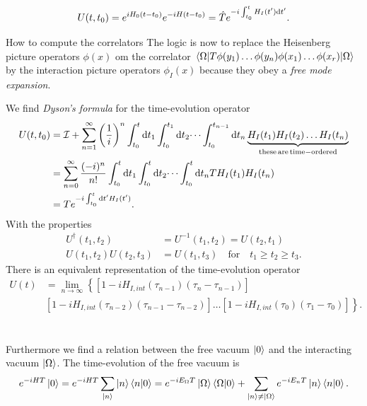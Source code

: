 \begin{equation}
U(t,t_0) = e^{i H_0(t-t_0)} e^{-i H(t-t_0)} = \hat{T}e^{-i \int_{t_0}^{t} H_I(t') \mathrm{d} t'}.
\end{equation}
\begin{mybox}{How to compute the correlators}
	The logic is now to replace the Heisenberg picture operators $\phi(x)$ om the correlator $\expval{T\phi(y_1) \dots \phi(y_n) \phi(x_1) \dots \phi(x_r)}{\Omega}$ by the interaction picture operators $\phi_I(x)$ because they obey a \emph{free mode expansion}.\\
\end{mybox}
We find \emph{Dyson's formula} for the time-evolution operator
\begin{align}
	U(t,t_0) &= \mathcal{I} + \sum_{n=1}^{\infty} \left(\frac{1}{i}\right)^n \int_{t_0}^{t} \mathrm{d} t_1 \int_{t_0}^{t_1} \mathrm{d} t_2 \dots \int_{t_0}^{t_{n-1}} \mathrm{d} t_n \underbrace{H_I(t_1)H_I(t_2)\dots H_I(t_n)}_{\mathrm{these \, are\, time-ordered}}\\
	&= \sum_{n=0}^{\infty} \frac{(-i)^n}{n!} \int_{t_0}^{t}\mathrm{d} t_1 \int_{t_0}^{t} \mathrm{d} t_2 \dots \int_{t_0}^{t} \mathrm{d} t_n T H_I (t_1)H_I(t_n) \\
	&=T e^{-i \int_{t_0}^{t} \mathrm{d} t'H_I(t')}.
\end{align}
With the properties
\begin{align}
	U^{\dagger}(t_1,t_2) &=U^{-1}(t_1,t_2) = U(t_2,t_1) \\
	U(t_1,t_2)U(t_2,t_3) &= U(t_1,t_3) \quad \mathrm{for} \quad t_1 \geq t_2 \geq t_3.
\end{align}
There is an equivalent representation of the time-evolution operator
\begin{align}
	U(t) &= \lim_{n\rightarrow \infty} \left\{  \left[1-i H_{I,int} (\tau_{n-1}) (\tau_n - \tau_{n-1})\right] \right. \\
	&\left.\left[1-i H_{I,int}(\tau_{n-2}) (\tau_{n-1}-\tau_{n-2}) \right]\dots \left[1-iH_{I, int} (\tau_0) (\tau_1-\tau_0) \right]   \right\}.
\end{align}
\\
\\
Furthermore we find a relation between the free vacuum $\ket{0}$ and the interacting vacuum $\ket{\Omega}$. The time-evolution of the free vacuum is
\begin{equation}
	e^{-iHT} \ket{0} = e^{-iHT} \sum_{\ket{n}} \ket{n} \braket{n}{0} = e^{- iE_{\Omega}T} \ket{\Omega}\braket{\Omega}{0}+\sum_{\ket{n} \neq \ket{\Omega}} e^{-iE_n T}\ket{n}\braket{n}{0}.
\end{equation}
